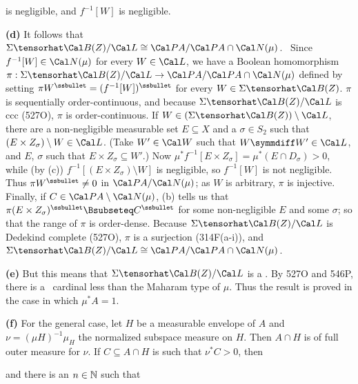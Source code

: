 {

\noindent is negligible, and $f^{-1}[W]$ is negligible.\ \Qed

\medskip

{\bf (d)} It follows that
$\Sigma\tensorhat\Cal B(Z)/\Cal L\cong\Cal PA/\Cal PA\cap\Cal N(\mu)$.
\Prf\ Since $f^{-1}[W]\in\Cal N(\mu)$ for every $W\in\Cal L$,
we have a Boolean homomorphism
$\pi:\Sigma\tensorhat\Cal B(Z)/\Cal L\to\Cal PA/\Cal PA\cap\Cal N(\mu)$
defined by setting
$\pi W^{\ssbullet}=(f^{-1}[W])^{\ssbullet}$ for every $W\in\Sigma\tensorhat\Cal B(Z)$.
$\pi$ is sequentially order-continuous, and because
$\Sigma\tensorhat\Cal B(Z)/\Cal L$ is ccc (527O),
$\pi$ is order-continuous.  If
$W\in(\Sigma\tensorhat\Cal B(Z))\setminus\Cal L$, there are a
non-negligible measurable set $E\subseteq X$ and a $\sigma\in S_2$
such that $(E\times Z_{\sigma})\setminus W\in\Cal L$.   
(Take $W'\in\Cal W$ such that
$W\symmdiff W'\in\Cal L$, and $E$, $\sigma$ such that
$E\times Z_{\sigma}\subseteq W'$.)   Now
$\mu^*f^{-1}[E\times Z_{\sigma}]=\mu^*(E\cap D_{\sigma})>0$, while (by
(c)) $f^{-1}[(E\times Z_{\sigma})\setminus W]$ is negligible, so
$f^{-1}[W]$ is not negligible.   Thus $\pi W^{\ssbullet}\ne 0$ in
$\Cal PA/\Cal N(\mu)$;  as $W$ is arbitrary, $\pi$ is injective.
Finally, if $C\in\Cal PA\setminus\Cal N(\mu)$, (b) tells us that
$\pi(E\times Z_{\sigma})^{\ssbullet}\Bsubseteq C^{\ssbullet}$ for some
non-negligible
$E$ and some $\sigma$;  so that the range of $\pi$ is order-dense.
Because $\Sigma\tensorhat\Cal B(Z)/\Cal L$ is Dedekind complete (527O),
$\pi$ is a surjection (314F(a-i)), and
$\Sigma\tensorhat\Cal B(Z)/\Cal L\cong\Cal PA/\Cal PA\cap\Cal N(\mu)$.\ \Qed

\medskip

{\bf (e)} But this means that
$\Sigma\tensorhat\Cal B(Z)/\Cal L$ is a \pssqa.
By 527O and 546P, there is a \qm\
cardinal less than the Maharam type of $\mu$.
Thus the result is proved in the case in which $\mu^*A=1$.

\medskip

{\bf (f)} For the general case, let $H$ be a measurable envelope of $A$
and $\nu=(\mu H)^{-1}\mu_H$ the normalized subspace measure on $H$.
Then $A\cap H$ is of full outer measure for $\nu$.
If $C\subseteq A\cap H$ is such that $\nu^*C>0$, then


\noindent and there is an $n\in\Bbb N$ such that

}
